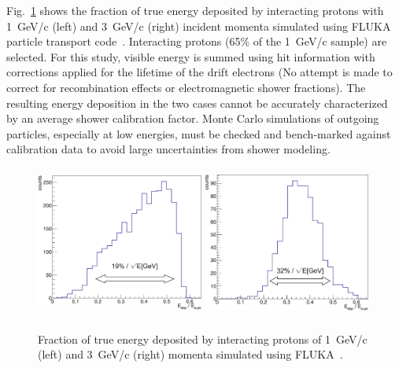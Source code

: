 Fig.~\ref{fig:hadronshwr} shows the fraction of true energy deposited by interacting protons with 1~GeV/c (left) and
3~GeV/c (right) incident momenta simulated using FLUKA particle transport code~\cite{fluka05}. 
Interacting protons (65\% of the 1~GeV/c sample) are selected.
For this study, visible energy is summed using hit information with corrections applied for the lifetime of 
the drift electrons (No attempt is made to correct for recombination effects or electromagnetic shower fractions). 
The resulting energy deposition in the two cases cannot be 
accurately characterized by an average shower calibration factor. Monte Carlo simulations of 
outgoing particles, especially at low energies, must be checked and bench-marked against calibration data to avoid
large uncertainties from shower modeling. 
\begin{figure}[h!]
  \centering
\includegraphics[width=0.49\textwidth,height=5.0cm]{figures/pr1GeV_v2a}
\includegraphics[width=0.49\textwidth,height=5.0cm]{figures/pr3GeV_v2a}
  \caption{Fraction of true energy deposited by interacting protons of 1~GeV/c (left) and
3~GeV/c (right) momenta simulated using FLUKA~\cite{fluka05}.
}
\label{fig:hadronshwr}
\end{figure}


